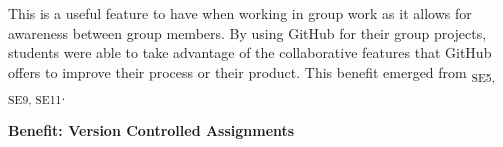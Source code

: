 This is a useful feature to have when working in group work as it allows for awareness between group members. By using GitHub for their group projects, students were able to take advantage of the collaborative features that GitHub offers to improve their process or their product. This benefit emerged from \textsubscript{SE5, SE9, SE11}.







\textbf{Benefit: Version Controlled Assignments} \\


